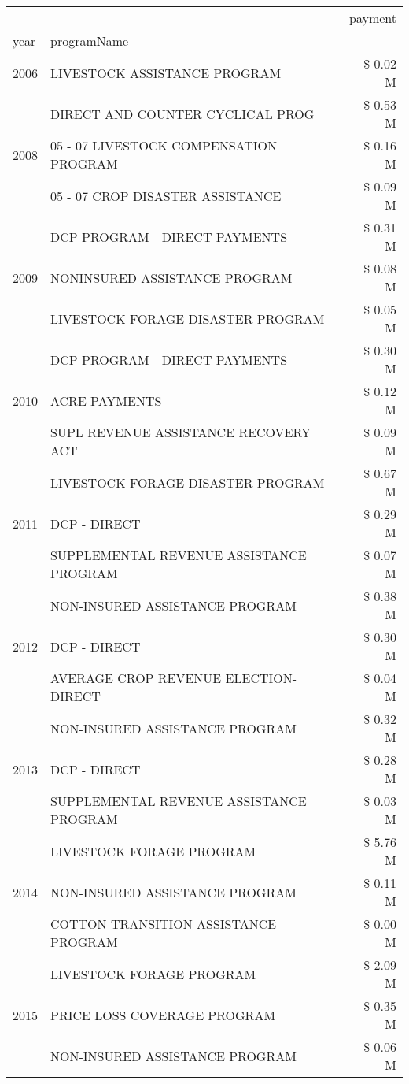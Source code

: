 \begin{tabular}{llr}
\toprule
 &  & payment \\
year & programName &  \\
\midrule
2006 & LIVESTOCK ASSISTANCE PROGRAM & \$ 0.02 M \\
\cline{1-3}
\multirow[t]{3}{*}{2008} & DIRECT AND COUNTER CYCLICAL PROG & \$ 0.53 M \\
 & 05 - 07 LIVESTOCK COMPENSATION PROGRAM & \$ 0.16 M \\
 & 05 - 07 CROP DISASTER ASSISTANCE & \$ 0.09 M \\
\cline{1-3}
\multirow[t]{3}{*}{2009} & DCP PROGRAM - DIRECT PAYMENTS & \$ 0.31 M \\
 & NONINSURED ASSISTANCE PROGRAM & \$ 0.08 M \\
 & LIVESTOCK FORAGE DISASTER  PROGRAM & \$ 0.05 M \\
\cline{1-3}
\multirow[t]{3}{*}{2010} & DCP PROGRAM - DIRECT PAYMENTS & \$ 0.30 M \\
 & ACRE PAYMENTS & \$ 0.12 M \\
 & SUPL REVENUE ASSISTANCE RECOVERY ACT & \$ 0.09 M \\
\cline{1-3}
\multirow[t]{3}{*}{2011} & LIVESTOCK FORAGE DISASTER PROGRAM & \$ 0.67 M \\
 & DCP - DIRECT & \$ 0.29 M \\
 & SUPPLEMENTAL REVENUE ASSISTANCE PROGRAM & \$ 0.07 M \\
\cline{1-3}
\multirow[t]{3}{*}{2012} & NON-INSURED ASSISTANCE PROGRAM & \$ 0.38 M \\
 & DCP - DIRECT & \$ 0.30 M \\
 & AVERAGE CROP REVENUE ELECTION-DIRECT & \$ 0.04 M \\
\cline{1-3}
\multirow[t]{3}{*}{2013} & NON-INSURED ASSISTANCE PROGRAM & \$ 0.32 M \\
 & DCP - DIRECT & \$ 0.28 M \\
 & SUPPLEMENTAL REVENUE ASSISTANCE PROGRAM & \$ 0.03 M \\
\cline{1-3}
\multirow[t]{3}{*}{2014} & LIVESTOCK FORAGE PROGRAM & \$ 5.76 M \\
 & NON-INSURED ASSISTANCE PROGRAM & \$ 0.11 M \\
 & COTTON TRANSITION ASSISTANCE PROGRAM & \$ 0.00 M \\
\cline{1-3}
\multirow[t]{3}{*}{2015} & LIVESTOCK FORAGE PROGRAM & \$ 2.09 M \\
 & PRICE LOSS COVERAGE PROGRAM & \$ 0.35 M \\
 & NON-INSURED ASSISTANCE PROGRAM & \$ 0.06 M \\

\end{tabular}
